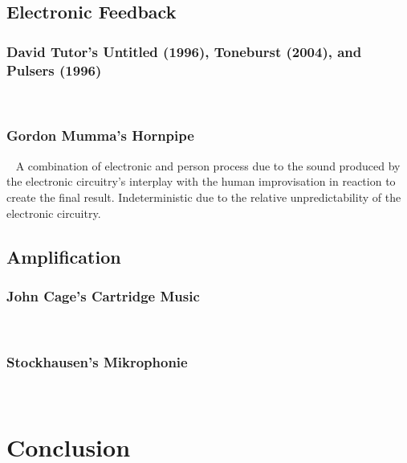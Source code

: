 \documentclass[titlepage]{scrartcl}
\begin{document}
    \subsection{Electronic Feedback}\label{ElecFeed}
    \subsubsection{David Tutor's Untitled (1996), Toneburst (2004), and Pulsers
    (1996)}
    ~\citeyearpar{tudor1996twfle}
    ~\citeyearpar{tudor2004lem}
    ~\citeyearpar{tudor1996twfle}
    \subsubsection{Gordon Mumma's Hornpipe}\label{hornpipe}
    ~\citeyearpar{mumma2002lem}
    A combination of electronic and person process due to the sound produced by
    the electronic circuitry's interplay with the human improvisation in
    reaction to create the final result.
    Indeterministic due to the relative unpredictability of the electronic
    circuitry.
    \subsection{Amplification}\label{amp}
    \subsubsection{John Cage's Cartridge Music} 
    ~\citeyearpar{cage2013cm}
    \subsubsection{Stockhausen's Mikrophonie}
    ~\citeyearpar{stockhausen1995mmt}

    \section{Conclusion}

    \printbibliography
\end{document}
